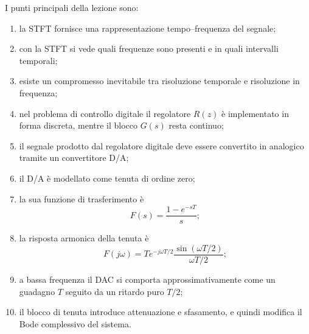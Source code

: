 I punti principali della lezione sono:
\begin{enumerate}
    \item la STFT fornisce una rappresentazione tempo--frequenza del segnale;
    \item con la STFT si vede quali frequenze sono presenti e in quali intervalli temporali;
    \item esiste un compromesso inevitabile tra risoluzione temporale e risoluzione in frequenza;
    \item nel problema di controllo digitale il regolatore \(R(z)\) è implementato in forma discreta, mentre il blocco \(G(s)\) resta continuo;
    \item il segnale prodotto dal regolatore digitale deve essere convertito in analogico tramite un convertitore D/A;
    \item il D/A è modellato come tenuta di ordine zero;
    \item la sua funzione di trasferimento è
    \[
    F(s)=\frac{1-e^{-sT}}{s};
    \]
    \item la risposta armonica della tenuta è
    \[
    F(j\omega)=T e^{-j\omega T/2}\frac{\sin(\omega T/2)}{\omega T/2};
    \]
    \item a bassa frequenza il DAC si comporta approssimativamente come un guadagno \(T\) seguito da un ritardo puro \(T/2\);
    \item il blocco di tenuta introduce attenuazione e sfasamento, e quindi modifica il Bode complessivo del sistema.
\end{enumerate}
